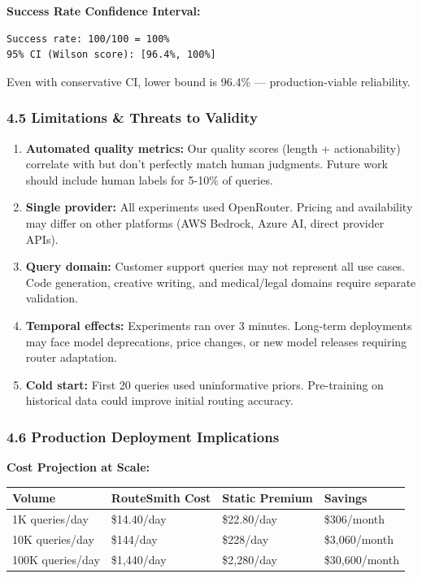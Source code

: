 \documentclass[
]{article}
\begin{document}
\textbf{Success Rate Confidence Interval:}

\begin{verbatim}
Success rate: 100/100 = 100%
95% CI (Wilson score): [96.4%, 100%]
\end{verbatim}

Even with conservative CI, lower bound is 96.4\% --- production-viable
reliability.

\hypertarget{limitations-threats-to-validity}{%
\subsubsection{4.5 Limitations \& Threats to
Validity}\label{limitations-threats-to-validity}}

\begin{enumerate}
\def\labelenumi{\arabic{enumi}.}
\item
  \textbf{Automated quality metrics:} Our quality scores (length +
  actionability) correlate with but don't perfectly match human
  judgments. Future work should include human labels for 5-10\% of
  queries.
\item
  \textbf{Single provider:} All experiments used OpenRouter. Pricing and
  availability may differ on other platforms (AWS Bedrock, Azure AI,
  direct provider APIs).
\item
  \textbf{Query domain:} Customer support queries may not represent all
  use cases. Code generation, creative writing, and medical/legal
  domains require separate validation.
\item
  \textbf{Temporal effects:} Experiments ran over 3 minutes. Long-term
  deployments may face model deprecations, price changes, or new model
  releases requiring router adaptation.
\item
  \textbf{Cold start:} First 20 queries used uninformative priors.
  Pre-training on historical data could improve initial routing
  accuracy.
\end{enumerate}

\hypertarget{production-deployment-implications}{%
\subsubsection{4.6 Production Deployment
Implications}\label{production-deployment-implications}}

\textbf{Cost Projection at Scale:}

\begin{longtable}[]{@{}llll@{}}
\toprule
Volume & RouteSmith Cost & Static Premium & Savings \\
\midrule
\endhead
1K queries/day & \$14.40/day & \$22.80/day & \$306/month \\
10K queries/day & \$144/day & \$228/day & \$3,060/month \\
100K queries/day & \$1,440/day & \$2,280/day & \$30,600/month \\
\bottomrule
\end{longtable}
\end{document}
